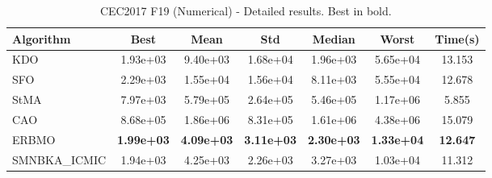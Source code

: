 \begin{table}[H]
\centering\small
\caption{CEC2017 F19 (Numerical) - Detailed results. Best in bold.}
\label{tab:cec2017_F19}
\begin{tabular}{lcccccc}
\toprule
\textbf{Algorithm} & \textbf{Best} & \textbf{Mean} & \textbf{Std} & \textbf{Median} & \textbf{Worst} & \textbf{Time(s)} \\
\midrule
KDO & 1.93e+03 & 9.40e+03 & 1.68e+04 & 1.96e+03 & 5.65e+04 & 13.153 \\
SFO & 2.29e+03 & 1.55e+04 & 1.56e+04 & 8.11e+03 & 5.55e+04 & 12.678 \\
StMA & 7.97e+03 & 5.79e+05 & 2.64e+05 & 5.46e+05 & 1.17e+06 & 5.855 \\
CAO & 8.68e+05 & 1.86e+06 & 8.31e+05 & 1.61e+06 & 4.38e+06 & 15.079 \\
ERBMO & \textbf{1.99e+03} & \textbf{4.09e+03} & \textbf{3.11e+03} & \textbf{2.30e+03} & \textbf{1.33e+04} & \textbf{12.647} \\
SMNBKA_ICMIC & 1.94e+03 & 4.25e+03 & 2.26e+03 & 3.27e+03 & 1.03e+04 & 11.312 \\
\bottomrule
\end{tabular}
\end{table}
